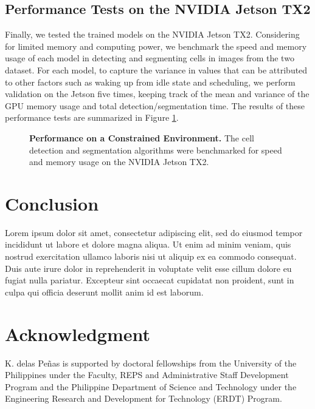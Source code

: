 \documentclass[10pt, journal, compsoc]{IEEEtran}
\begin{document}
\subsection{Performance Tests on the NVIDIA Jetson TX2}
Finally, we tested the trained models on the NVIDIA Jetson TX2. Considering for limited memory and computing power, we benchmark the speed and memory usage of each model in detecting and segmenting cells in images from the two dataset. For each model, to capture the variance in values that can be attributed to other factors such as waking up from idle state and scheduling, we perform validation on the Jetson five times, keeping track of the mean and variance of the GPU memory usage and total detection/segmentation time. The results of these performance tests are summarized in Figure \ref{fig:performance_jetson}.
\begin{figure}
\caption{\textbf{Performance on a Constrained Environment.} The cell detection and segmentation algorithms were benchmarked for speed and memory usage on the NVIDIA Jetson TX2.}
\label{fig:performance_jetson}
\end{figure}
\section{Conclusion}
Lorem ipsum dolor sit amet, consectetur adipiscing elit, sed do eiusmod tempor incididunt ut labore et dolore magna aliqua. Ut enim ad minim veniam, quis nostrud exercitation ullamco laboris nisi ut aliquip ex ea commodo consequat. Duis aute irure dolor in reprehenderit in voluptate velit esse cillum dolore eu fugiat nulla pariatur. Excepteur sint occaecat cupidatat non proident, sunt in culpa qui officia deserunt mollit anim id est laborum.


\section*{Acknowledgment}
K. delas Pe\~nas is supported by doctoral fellowships from the University of the Philippines under the Faculty, REPS and Administrative Staff Development Program and the Philippine Department of Science and Technology under the Engineering Research and Development for Technology (ERDT) Program.


\ifCLASSOPTIONcaptionsoff
  \newpage
\fi
\end{document}
